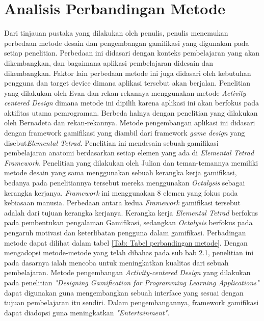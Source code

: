 \section{Analisis Perbandingan Metode}
Dari tinjauan pustaka yang dilakukan oleh penulis, penulis menemukan perbedaan metode desain dan pengembangan gamifikasi yang digunakan pada setiap penelitian.
Perbedaan ini didasari dengan konteks pembelajaran yang akan dikembangkan, dan bagaimana aplikasi pembelajaran didesain dan dikembangkan.
Faktor lain perbedaan metode ini juga didasari oleh kebutuhan pengguna dan target device dimana aplikasi tersebut akan berjalan.
Penelitian yang dilakukan oleh Evan dan rekan-rekannya menggunakan metode \textit{Activity-centered Design} dimana metode ini dipilih karena aplikasi ini akan berfokus pada aktifitas utama pemrograman.
Berbeda halnya dengan penelitian yang dilakukan oleh Bernadeta dan rekan-rekannya. Metode pengembangan aplikasi ini didasari dengan framework gamifikasi yang diambil dari framework \textit{game design} yang disebut\textit{Elemental Tetrad}.
Penelitian ini mendesain sebuah gamifikasi pembelajaran anatomi berdasarkan setiap elemen yang ada di \textit{Elemental Tetrad Framework}.
Penelitian yang dilakukan oleh Julian dan teman-temannya memiliki metode desain yang sama menggunakan sebuah kerangka kerja gamifikasi, 
bedanya  pada penelitiannya tersebut mereka menggunakan \textit{Octalysis} sebagai kerangka kerjanya. \textit{Framework} ini menggunakan 8 elemen yang fokus pada kebiasaan manusia.
Perbedaan antara kedua \textit{Framework} gamifikasi tersebut adalah dari tujuan kerangka kerjanya. Kerangka kerja \textit{Elemental Tetrad} berfokus pada pembentukan pengalaman Gamifikasi,
sedangkan \textit{Octalysis} berfokus pada pengaruh motivasi dan keterlibatan pengguna dalam gamifikasi. Perbadingan metode dapat dilihat dalam tabel \ref*{Tab: Tabel perbandingan metode}.
Dengan mengadopsi metode-metode yang telah dibahas pada sub bab 2.1, penelitian ini pada dasarnya ialah mencoba untuk meningkatkan kualitas dari sebuah pembelajaran.
Metode pengembangan \textit{Activity-centered Design} yang dilakukan pada penelitian \textit{"Designing Gamification for Programming Learning Applications"} dapat digunakan guna mengembangkan sebuah interface yang sesuai dengan tujuan pembelajaran itu sendiri.
Dalam pengembangannya, framework gamifikasi dapat diadopsi guna meningkatkan \textit{"Entertainment"}. 
\newpage
